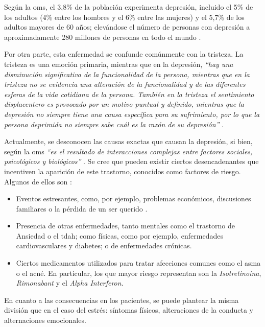         Según la \gls{oms}, el 3,8\% de la población experimenta depresión, incluido el 5\% de los adultos (4\% entre los hombres y el 6\% entre las mujeres) y el 5,7\% de los adultos mayores de 60 años; elevándose el número de personas con depresión a aproximadamente 280 millones de personas en todo el mundo \cite{oms_depresion_2023}.

        Por otra parte, esta enfermedad se confunde comúnmente con la tristeza. La tristeza es una emoción primaria, mientras que en la depresión, \textit{``hay una disminución significativa de la funcionalidad de la persona, mientras que en la tristeza no se evidencia una alteración de la funcionalidad y de las diferentes esferas de la vida cotidiana de la persona. También en la tristeza el sentimiento displacentero es provocado por un motivo puntual y definido, mientras que la depresión no siempre tiene una causa específica para su sufrimiento, por lo que la persona deprimida no siempre sabe cuál es la razón de su depresión''} \cite{ospina_perez_entendiendo_2018}.

        Actualmente, se desconocen las causas exactas que causan la depresión, si bien, según la \gls{oms} \textit{``es el resultado de interacciones complejas entre factores sociales, psicológicos y biológicos''} \cite{oms_depresion_2023}. Se cree que pueden existir ciertos desencadenantes que incentiven la aparición de este trastorno, conocidos como factores de riesgo. Algunos de ellos son \cite{karamchandani_batra_sistema_2021}:

        \begin{itemize}
            \item Eventos estresantes, como, por ejemplo, problemas económicos, discusiones familiares o la pérdida de un ser querido \cite{tennant_life_2002}.
            \item Presencia de otras enfermedades, tanto mentales como el trastorno de Ansiedad o el \gls{tdah}; como físicas, como por ejemplo, enfermedades cardiovasculares y diabetes; o de enfermedades crónicas. 
            \item Ciertos medicamentos utilizados para tratar afecciones comunes como el asma o el acné. En particular, los que mayor riesgo representan son la \textit{Isotretinoína}, \textit{Rimonabant} y el \textit{Alpha Interferon}.
        \end{itemize}

        En cuanto a las consecuencias en los pacientes, se puede plantear la misma división que en el caso del estrés:  síntomas físicos, alteraciones de la conducta y alternaciones emocionales.
        
